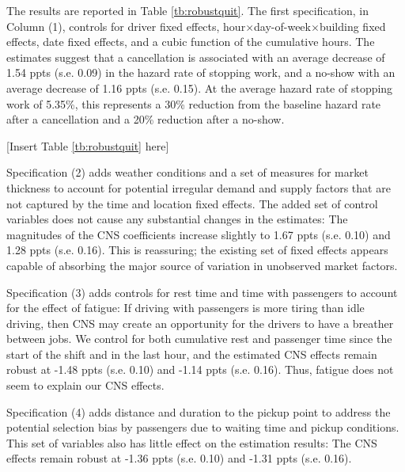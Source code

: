 \documentclass[reviewmode,AEJ]{AEA}
\begin{document}
The results %
are reported in Table \ref{tb:robustquit}. 
The first specification, in Column (1), controls for driver fixed effects, hour\(\times\)day-of-week\(\times\)building fixed effects, date fixed effects, and a cubic function of the cumulative hours. The estimates %
suggest that a cancellation is associated with an average decrease of 1.54 ppts (s.e. 0.09) in the hazard rate of stopping work, and a no-show with an average decrease
of 1.16 ppts (s.e. 0.15). At the average hazard rate of stopping work of 5.35\%, this represents a 30\% reduction from the baseline hazard rate after a cancellation and a 20\% reduction after a no-show.

\begin{center}
	[Insert Table \ref{tb:robustquit} here]
\end{center}

Specification (2) adds weather conditions and a set of measures for market thickness to account for potential irregular demand and supply factors that are not captured by the time and location fixed effects. The added set of control variables does not cause any substantial changes in the estimates: The magnitudes of the CNS coefficients increase slightly to 1.67 ppts (s.e. 0.10) and 1.28 ppts (s.e. 0.16). This is reassuring; the existing set of fixed effects appears capable of absorbing the major source of variation in unobserved market factors.

Specification (3) adds controls for rest time and time with passengers %
 to account for the effect of fatigue: If driving with passengers %
is more tiring than idle driving, then CNS may create an opportunity for the drivers to have a breather between jobs. We control for both cumulative rest and passenger time since the start of the shift and in the last hour, and the estimated CNS effects remain robust at -1.48 ppts (s.e. 0.10) and -1.14 ppts (s.e. 0.16). Thus, fatigue does not seem to explain our CNS effects. %

Specification (4) adds distance and duration to the pickup point to address the potential selection bias by passengers due to waiting time and pickup conditions. This set of variables also has little effect on the estimation results: The CNS effects remain robust at -1.36 ppts (s.e. 0.10) and -1.31 ppts (s.e. 0.16).
\end{document}
